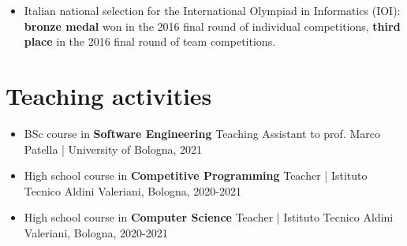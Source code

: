 \documentclass[10pt, a4paper]{extarticle}
\begin{document}
\begin{itemize}
  \item Italian national selection for the International Olympiad in Informatics (IOI): \textbf{bronze medal} won in the 2016 final round of individual competitions, \textbf{third place} in the 2016 final round of team competitions.


\end{itemize}

\section*{Teaching activities}


\begin{itemize}
  \item BSc course in \textbf{Software Engineering} \hfill Teaching Assistant to prof. Marco Patella |  University of Bologna, 2021

  \item High school course in \textbf{Competitive Programming} \hfill Teacher | Istituto Tecnico Aldini Valeriani, Bologna, 2020-2021

  \item High school course in \textbf{Computer Science} \hfill Teacher |  Istituto Tecnico Aldini Valeriani, Bologna, 2020-2021
\end{itemize}
\nocite{*}

\end{document}
